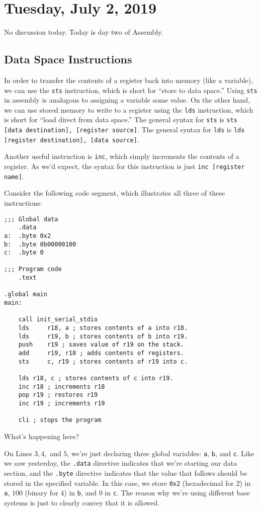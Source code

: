 \section{Tuesday, July 2, 2019}
No discussion today. Today is day two of Assembly.


\subsection{Data Space Instructions}

In order to transfer the contents of a register back into memory (like a variable), we can use the \verb!sts! instruction, which is short for ``store to data space.'' Using \verb!sts! in assembly is analogous to assigning a variable some value. On the other hand, we can use stored memory to write to a register using the \verb!lds! instruction, which is short for ``load direct from data space.'' The general syntax for \verb!sts! is \verb!sts [data destination], [register source]!. The general syntax for \verb!lds! is \verb!lds [register destination], [data source]!. 

Another useful instruction is \verb!inc!, which simply increments the contents of a register. As we'd expect, the syntax for this instruction is just \verb!inc [register name]!.


Consider the following code segment, which illustrates all three of these instructions:


\lstset{language=[x64]Assembler}
\lstset{
caption=Storing and Loading to Data Spaces
}
\begin{lstlisting}
;;; Global data
    .data
a:  .byte 0x2
b:  .byte 0b00000100
c:  .byte 0

;;; Program code
    .text

.global main
main:

    call init_serial_stdio
    lds     r18, a ; stores contents of a into r18.
    lds     r19, b ; stores contents of b into r19.
    push    r19 ; saves value of r19 on the stack.
    add     r19, r18 ; adds contents of registers.
    sts     c, r19 ; stores contents of r19 into c.
    
    lds r18, c ; stores contents of c into r19.
    inc r18 ; increments r18
    pop r19 ; restores r19
    inc r19 ; increments r19
    
    cli ; stops the program
\end{lstlisting}


What's happening here?

On Lines $3, 4,$ and $5$, we're just declaring three global variables: \verb!a!, \verb!b!, and \verb!c!. Like we saw yesterday, the \verb!.data! directive indicates that we're starting our data section, and the \verb!.byte! directive indicates that the value that follows should be stored in the specified variable. In this case, we store \verb!0x2! (hexadecimal for $2$) in \verb!a!, $100$ (binary for $4$) in \verb!b!, and $0$ in \verb!c!. The reason why we're using different base systems is just to clearly convey that it is allowed. 

